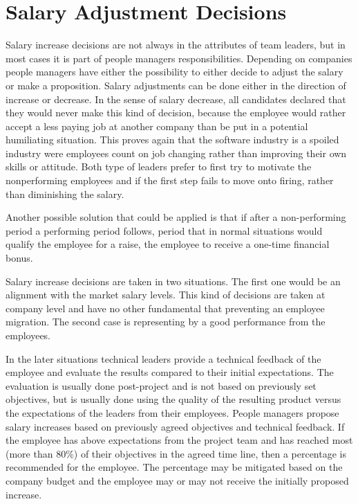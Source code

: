 \section{Salary Adjustment Decisions}
\label{sec:salary}
Salary increase decisions are not always in the attributes of team leaders, but in most cases it is part of people managers responsibilities. Depending on companies people managers have either the possibility to either decide to adjust the salary or make a proposition.
Salary adjustments can be done either in the direction of increase or decrease. In the sense of salary decrease, all candidates declared that they would never make this kind of decision, because the employee would rather accept a less paying job at another company than be put in a potential humiliating situation. This proves again that the software industry is a spoiled industry were employees count on job changing rather than improving their own skills or attitude. Both type of leaders prefer to first try to motivate the nonperforming employees and if the first step fails to move onto firing, rather than diminishing the salary. 

Another possible solution that could be applied is that if after a non-performing period a performing period follows, period that in normal situations would qualify the employee for a raise, the employee to receive a one-time financial bonus.

Salary increase decisions are taken in two situations. The first one would be an alignment with the market salary levels. This kind of decisions are taken at company level and have no other fundamental that preventing an employee migration. The second case is representing by a good performance from the employees.

In the later situations technical leaders provide a technical feedback of the employee and evaluate the results compared to their initial expectations. The evaluation is usually done post-project and is not based on previously set objectives, but is usually done using the quality of the resulting product versus the expectations of the leaders from their employees. People managers propose salary increases based on previously agreed objectives and technical feedback. If the employee has above expectations from the project team and has reached most (more than 80\%) of their objectives in the agreed time line, then a percentage is recommended for the employee. The percentage may be mitigated based on the company budget and the employee may or may not receive the initially proposed increase.

